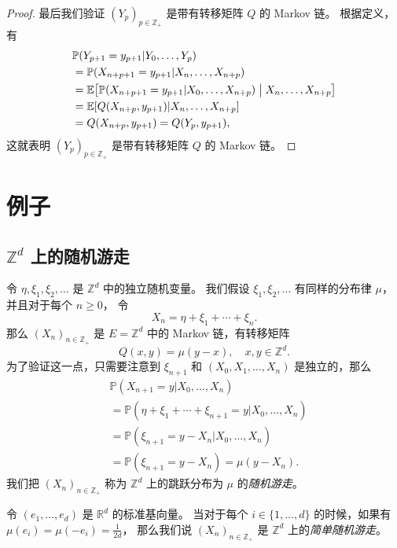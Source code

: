 \documentclass[fontset=none]{Notes}
\begin{document}
\begin{proof}
  最后我们验证 $(Y_p)_{p\in \mathbb{Z}_+}$ 是带有转移矩阵 $Q$ 的 Markov 链。
  根据定义，有
  \begin{align*}
    &\mathbb{P}(Y_{p+1}=y_{p+1}|Y_0,\dots,Y_p)\\
    &=\mathbb{P}(X_{n+p+1}=y_{p+1}|X_n,\dots,X_{n+p})\\
    &=\mathbb{E}\bigl[\mathbb{P}(X_{n+p+1}=y_{p+1}|X_0,\dots,X_{n+p})\bigm| X_n,\dots,X_{n+p}\bigr]\\
    &=\mathbb{E}[Q(X_{n+p},y_{p+1})|X_n,\dots,X_{n+p}]\\
    &=Q(X_{n+p},y_{p+1})=Q(Y_p,y_{p+1}),
  \end{align*}
  这就表明 $(Y_p)_{p\in \mathbb{Z}_+}$ 是带有转移矩阵 $Q$ 的 Markov 链。
\end{proof}


\section{例子}

\subsection{$\mathbb{Z}^d$ 上的随机游走}

令 $\eta,\xi_1,\xi_2,\dots$ 是 $\mathbb{Z}^d$ 中的独立随机变量。
我们假设 $\xi_1,\xi_2,\dots$ 有同样的分布律 $\mu$，并且对于每个 $n\geq 0$，
令
\[
  X_n=\eta+\xi_1+\cdots+\xi_n.
\] 
那么 $(X_n)_{n\in \mathbb{Z}_+}$ 是 $E=\mathbb{Z}^d$ 
中的 Markov 链，有转移矩阵
\[
  Q(x,y)=\mu(y-x),\quad x,y\in \mathbb{Z}^d.
\]
为了验证这一点，只需要注意到 $\xi_{n+1}$ 和 $(X_0,X_1,\dots,X_n)$
是独立的，那么
\begin{align*}
  &\mathbb{P}(X_{n+1}=y|X_0,\dots,X_n)\\
  &=\mathbb{P}(\eta+\xi_1+\cdots+\xi_{n+1}=y|X_0,\dots,X_n)\\
  &=\mathbb{P}(\xi_{n+1}=y-X_n|X_0,\dots,X_n)\\
  &=
  \mathbb{P}(\xi_{n+1}=y-X_n)=\mu(y-X_n).
\end{align*}
我们把 $(X_n)_{n\in \mathbb{Z}_+}$ 称为 $\mathbb{Z}^d$
上的跳跃分布为 $\mu$ 的\emph{随机游走}。

令 $(e_1,\dots,e_d)$ 是 $\mathbb{R}^d$ 的标准基向量。
当对于每个 $i\in\{1,\dots,d\}$ 的时候，如果有 $\mu(e_i)=\mu(-e_i)=\frac{1}{2d}$，
那么我们说 $(X_n)_{n\in \mathbb{Z}_+}$ 是 $\mathbb{Z}^d$ 上的\emph{简单随机游走}。
\end{document}
